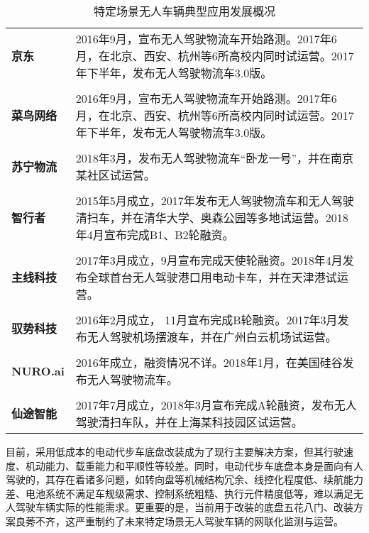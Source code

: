 \begin{table}[htbp]
	\centering%
	\caption[centering]{特定场景无人车辆典型应用发展概况}%
	\label{共享单车日均使用总量与对应时间段的共享单车数量}%
	\begin{tabular}{C{2cm}p{10cm}}	
		\toprule
		 & \\ 
		\midrule
		\textbf{京东} & 2016年9月，宣布无人驾驶物流车开始路测。2017年6月，在北京、西安、杭州等6所高校内同时试运营。2017年下半年，发布无人驾驶物流车3.0版。 \\
		\\
		\textbf{菜鸟网络} & 2016年9月，宣布无人驾驶物流车开始路测。2017年6月，在北京、西安、杭州等6所高校内同时试运营。2017年下半年，发布无人驾驶物流车3.0版。 \\
		\\
		\textbf{苏宁物流} & 2018年3月，发布无人驾驶物流车“卧龙一号”，并在南京某社区试运营。 \\
		\\
		\textbf{智行者} & 2015年5月成立，2017年发布无人驾驶物流车和无人驾驶清扫车，并在清华大学、奥森公园等多地试运营。2018年4月宣布完成B1、B2轮融资。 \\
		\\
		\textbf{主线科技} & 2017年3月成立，9月宣布完成天使轮融资。2018年4月发布全球首台无人驾驶港口用电动卡车，并在天津港试运营。 \\
		\\
		\textbf{驭势科技} & 2016年2月成立， 11月宣布完成B轮融资。2017年3月发布无人驾驶机场摆渡车，并在广州白云机场试运营。 \\
		\\
		\textbf{NURO.ai} & 2016年成立，融资情况不详。2018年1月，在美国硅谷发布无人驾驶物流车。 \\
		\\
		\textbf{仙途智能} & 2017年7月成立，2018年3月宣布完成A轮融资，发布无人驾驶清扫车队，并在上海某科技园区试运营。\\
		\bottomrule
	\end{tabular}
\end{table}

目前，采用低成本的电动代步车底盘改装成为了现行主要解决方案，但其行驶速度、机动能力、载重能力和平顺性等较差。同时，电动代步车底盘本身是面向有人驾驶的，其存在着诸多问题，如转向盘等机械结构冗余、线控化程度低、续航能力差、电池系统不满足车规级需求、控制系统粗糙、执行元件精度低等，难以满足无人驾驶车辆实际的性能需求。更重要的是，当前用于改装的底盘五花八门、改装方案良莠不齐，这严重制约了未来特定场景无人驾驶车辆的网联化监测与运营。

